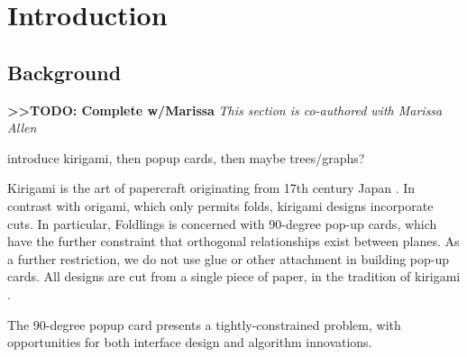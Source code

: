 \chapter{Introduction}

\section{Background}\label{background}

\textbf{\textgreater{}\textgreater{}TODO: Complete w/Marissa} \emph{This
section is co-authored with Marissa Allen}

introduce kirigami, then popup cards, then maybe trees/graphs?

Kirigami is the art of papercraft originating from 17th century Japan
\citet{temko1978magic}. In contrast with origami, which only permits
folds, kirigami designs incorporate cuts. In particular, Foldlings is
concerned with 90-degree pop-up cards, which have the further constraint
that orthogonal relationships exist between planes. As a further
restriction, we do not use glue or other attachment in building pop-up
cards. All designs are cut from a single piece of paper, in the
tradition of kirigami \citet{temko1978magic}.

The 90-degree popup card presents a tightly-constrained problem, with
opportunities for both interface design and algorithm innovations.
